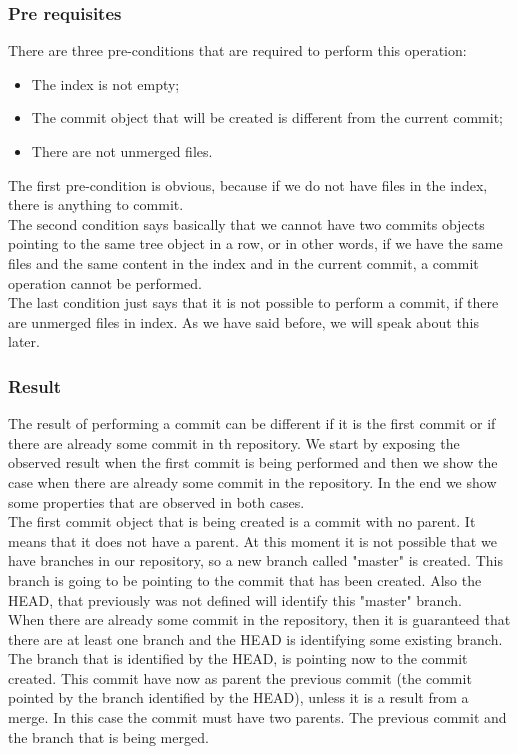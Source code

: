 \subsubsection{Pre requisites}
There are three pre-conditions that are required to perform this
operation:
\begin{itemize}
   \item The index is not empty;
   \item The commit object that will be created is different from the
   current commit;
   \item There are not unmerged files.
\end{itemize}
The first pre-condition is obvious, because if we do not have files in
the index, there is anything to commit.\\

The second condition says basically
that we cannot have two commits objects pointing to the same
tree object in a row, or in other words, if we have the same files and
the same content in the index and in the current commit, a commit
operation cannot be performed. \\

The last condition just says that it is not possible to perform a
commit, if there are unmerged files in index. As we have said before,
we will speak about this later.

\subsubsection{Result}
The result of performing a commit can be different if it is the first
commit or if there are already some commit in th repository. 
We start by exposing the observed result when the first commit is
being performed and then we show the case when there are already some
commit in the repository. In the end we show some properties that are
observed in both cases.\\

The first commit object that is being created is a commit with no
parent. It means that it does not have a parent. At this moment it is
not possible that we have branches in our repository, so a new branch 
called "master" is created. This branch is going to be pointing to 
the commit that has been created. Also the HEAD, that previously was 
not defined will identify this "master" branch.\\

When there are already some commit in the repository, then it is
guaranteed that there are at least one branch and the HEAD is
identifying some existing branch. The branch that is identified by the
HEAD, is pointing now to the commit created. This commit have now as
parent the previous commit (the commit pointed by the branch
identified by the HEAD), unless it is a result from a merge. In this
case the commit must have two parents. The previous commit and the
branch that is being merged.\\

